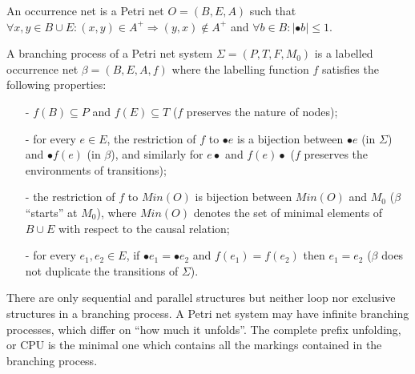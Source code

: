 \documentclass[dvips,...]{llncs}
\begin{document}
\begin{definition}\label{def:occurrenceNet}
An occurrence net is a Petri net $O=(B,E,A)$ such that $\forall x,y\in B\cup E:(x,y)
\in A^{+}\Rightarrow(y,x)\notin A^{+}$ and $\forall b\in B:|\bullet b|\leq 1$.
\end{definition}

\begin{definition}\label{def:branchingProcess}
A branching process of a Petri net system $\Sigma=(P,T,F,M_{0})$ is a labelled occurrence net $\beta=(B,E,A,f)$ where the labelling function $f$ satisfies the following properties:
	\begin{itemize}
		\item[-] $f(B)\subseteq P$ and $f(E)\subseteq T$ ($f$ preserves the nature of nodes);
		\item[-] for every $e\in E$, the restriction of $f$ to $\bullet e$ is a bijection between $\bullet e$ (in $\Sigma$) and $\bullet f(e)$ (in $\beta$), and similarly for $e\bullet$ and $f(e)\bullet$ ($f$ preserves the environments of transitions);
		\item[-] the restriction of $f$ to $Min(O)$ is bijection between $Min(O)$ and $M_{0}$ ($\beta$ ``starts'' at $M_{0}$), where $Min(O)$ denotes the set of minimal elements of $B\cup E$ with respect to the causal relation;
		\item[-] for every $e_{1},e_{2}\in E$, if $\bullet e_{1}=\bullet e_{2}$ and $f(e_{1})=f(e_{2})$ then $e_{1}=e_{2}$ ($\beta$ does not duplicate the transitions of $\Sigma$).
	\end{itemize}
\end{definition}

There are only sequential and parallel structures but neither loop nor exclusive structures in a branching process. A Petri net system may have infinite branching processes, which differ on ``how much it unfolds''. The complete prefix unfolding, or CPU is the minimal one which contains all the markings contained in the branching process.
\end{document}
